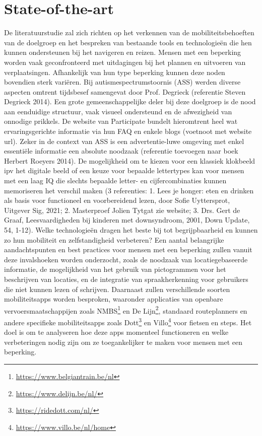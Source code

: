 
\section{State-of-the-art}%
\label{sec:state-of-the-art}
  
  De literatuurstudie zal zich richten op het verkennen van de mobiliteitsbehoeften van de doelgroep en het bespreken van bestaande tools en technologieën die hen kunnen ondersteunen bij het navigeren en reizen.
  Mensen met een beperking worden vaak geconfronteerd met uitdagingen bij het plannen en uitvoeren van verplaatsingen. Afhankelijk van hun type beperking kunnen deze noden bovendien sterk variëren. Bij autismespectrumstoornis (ASS) werden diverse aspecten omtrent tijdsbesef samengevat door Prof. Degrieck (referentie Steven Degrieck 2014). Een grote gemeenschappelijke deler bij deze doelgroep is de nood aan eenduidige structuur, vaak visueel ondersteund en de afwezigheid van onnodige prikkels. De website van Participate bundelt hieromtrent heel wat ervaringsgerichte informatie via hun FAQ en enkele blogs (voetnoot met website url). Zeker in de context van ASS is een advertentie-luwe omgeving met enkel essentiële informatie een absolute noodzaak (referentie toevoegen naar boek Herbert Roeyers 2014). De mogelijkheid om te kiezen voor een klassiek klokbeeld ipv het digitale beeld of een keuze voor bepaalde lettertypes kan voor mensen met een laag IQ die slechts bepaalde letter- en cijfercombinaties kunnen memoriseren het verschil maken (3 referenties: 1. Lees je honger: eten en drinken als basis voor functioneel en voorbereidend lezen, door Sofie Uyttersprot, Uitgever Sig, 2021; 2. Masterproef Jolien Tytgat zie website; 3. Drs. Gert de Graaf, Leesvaardigheden bij kinderen met downsyndroom, 2001, Down Update, 54, 1-12).  Welke technologieën dragen het beste bij tot begrijpbaarheid en kunnen zo hun mobiliteit en zelfstandigheid verbeteren?
  Een aantal belangrijke aandachtspunten en best practices voor mensen met een beperking zullen vanuit deze invalshoeken worden onderzocht, zoals de noodzaak van locatiegebaseerde informatie, de mogelijkheid van het gebruik van pictogrammen voor het beschrijven van locaties, en de integratie van spraakherkenning voor gebruikers die niet kunnen lezen of schrijven.
  Daarnaast zullen verschillende soorten mobiliteitsapps worden besproken, waaronder applicaties van openbare vervoersmaatschappijen zoals NMBS\footnote{\url{https://www.belgiantrain.be/nl}} en De Lijn\footnote{\url{https://www.delijn.be/nl/}}, standaard routeplanners en andere specifieke mobiliteitsapps zoals Dott\footnote{\url{https://ridedott.com/nl/}} en Villo\footnote{\url{https://www.villo.be/nl/home}} voor fietsen en steps. Het doel is om te analyseren hoe deze apps momenteel functioneren en welke verbeteringen nodig zijn om ze toegankelijker te maken voor mensen met een beperking.
